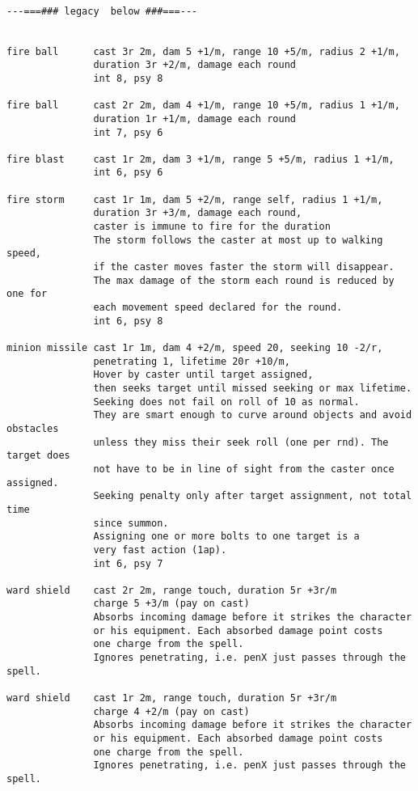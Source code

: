 \

\small \begin{verbatim}
---===### legacy  below ###===---


fire ball      cast 3r 2m, dam 5 +1/m, range 10 +5/m, radius 2 +1/m,
               duration 3r +2/m, damage each round
               int 8, psy 8

fire ball      cast 2r 2m, dam 4 +1/m, range 10 +5/m, radius 1 +1/m,
               duration 1r +1/m, damage each round
               int 7, psy 6

fire blast     cast 1r 2m, dam 3 +1/m, range 5 +5/m, radius 1 +1/m,
               int 6, psy 6

fire storm     cast 1r 1m, dam 5 +2/m, range self, radius 1 +1/m,
               duration 3r +3/m, damage each round,
               caster is immune to fire for the duration
               The storm follows the caster at most up to walking speed,
               if the caster moves faster the storm will disappear.
               The max damage of the storm each round is reduced by one for
               each movement speed declared for the round.
               int 6, psy 8

minion missile cast 1r 1m, dam 4 +2/m, speed 20, seeking 10 -2/r,
               penetrating 1, lifetime 20r +10/m,
               Hover by caster until target assigned,
               then seeks target until missed seeking or max lifetime.
               Seeking does not fail on roll of 10 as normal.
               They are smart enough to curve around objects and avoid obstacles
               unless they miss their seek roll (one per rnd). The target does
               not have to be in line of sight from the caster once assigned.
               Seeking penalty only after target assignment, not total time
               since summon.
               Assigning one or more bolts to one target is a
               very fast action (1ap).
               int 6, psy 7

ward shield    cast 2r 2m, range touch, duration 5r +3r/m
               charge 5 +3/m (pay on cast)
               Absorbs incoming damage before it strikes the character
               or his equipment. Each absorbed damage point costs
               one charge from the spell.
               Ignores penetrating, i.e. penX just passes through the spell.

ward shield    cast 1r 2m, range touch, duration 5r +3r/m
               charge 4 +2/m (pay on cast)
               Absorbs incoming damage before it strikes the character
               or his equipment. Each absorbed damage point costs
               one charge from the spell.
               Ignores penetrating, i.e. penX just passes through the spell.


\end{verbatim}
